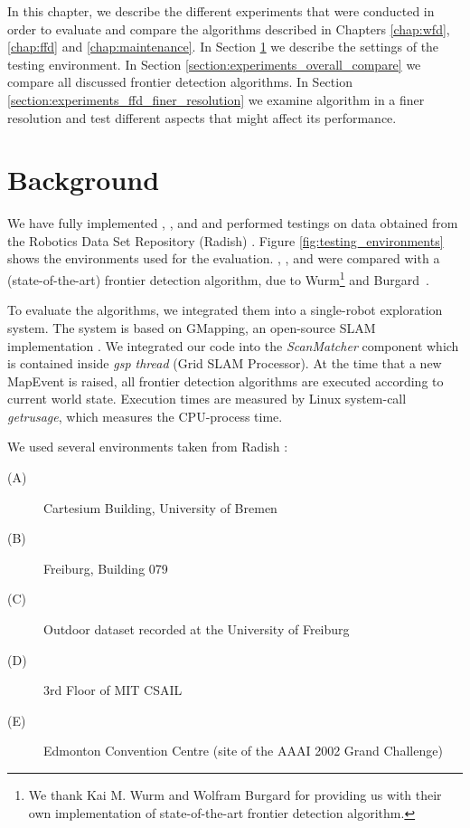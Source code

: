 In this chapter, we describe the different experiments that were conducted in
order to evaluate and compare the algorithms described in Chapters
\ref{chap:wfd}, \ref{chap:ffd} and \ref{chap:maintenance}. In Section
\ref{section:experiments_background} we describe the settings of the testing
environment. In Section \ref{section:experiments_overall_compare} we compare 
all discussed frontier detection algorithms. In Section
\ref{section:experiments_ffd_finer_resolution} we examine \FFD algorithm in a
finer resolution and test different aspects that might affect its performance.

\section{Background}
\label{section:experiments_background}
We have fully implemented \WFD, \WFDINC, \WFDIP and \FFD and performed testings
on data obtained from the Robotics Data Set Repository (Radish) \cite{Radish}. 
Figure \ref{fig:testing_environments} shows the environments used for
the evaluation. \WFD, \WFDINC, \WFDIP and \FFD were compared with a \SOTA (state-of-the-art)
frontier detection algorithm, due to Wurm\footnote{We thank Kai M. Wurm and Wolfram Burgard for
providing us with their own implementation of state-of-the-art frontier
detection algorithm.} and Burgard~\cite{wurm08iros,kai_2010_email}.

To evaluate the algorithms, we integrated them into a single-robot exploration
system. The system is based on GMapping, an open-source SLAM implementation
\cite{grisetti05icra, grisetti07tro}.
We integrated our code into the 
\emph{ScanMatcher} component which is contained inside \emph{gsp thread} (Grid
SLAM Processor). At the time that a new MapEvent is raised, all frontier
detection algorithms are executed according to current world state. Execution
times are measured by Linux system-call \emph{getrusage}, which measures the
CPU-process time.

We used several environments taken from Radish \cite{Radish}:
\begin{description}
  \item[(A)] Cartesium Building, University of Bremen
  \item[(B)] Freiburg, Building 079
  \item[(C)] Outdoor dataset recorded at the University of
  Freiburg
  \item[(D)] 3rd Floor of MIT CSAIL 
  \item[(E)] Edmonton Convention Centre (site of the AAAI 2002 Grand
  Challenge)
\end{description}


